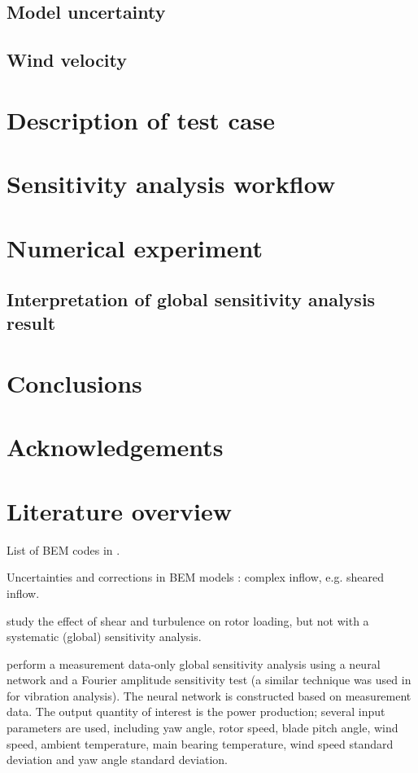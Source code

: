 \documentclass[review]{elsarticle}
\numberwithin{equation}{section}
\newcommand{\myreferences}{./Bibliography/references,./Bibliography/Mendeley_refs}
\numberwithin{equation}{section}
\begin{document}
\subsection{Model uncertainty}
\subsection{Wind velocity}

\section{Description of test case}

\section{Sensitivity analysis workflow}

\section{Numerical experiment}
\subsection{Interpretation of global sensitivity analysis result}

\section{Conclusions}

\section*{Acknowledgements}


\appendix
\section{Literature overview}
List of BEM codes in \cite{Sayed2019,Vorpahl2013}.

Uncertainties and corrections in BEM models \cite{Madsen2012}: complex inflow, e.g. sheared inflow.

\cite{Eggers2003} study the effect of shear and turbulence on rotor loading, but not with a systematic (global) sensitivity analysis.

\cite{McKay2014} perform a measurement data-only global sensitivity analysis using a neural network and a Fourier amplitude sensitivity test (a similar technique was used in \cite{Kusiak2010} for vibration analysis). The neural network is constructed based on measurement data. The output quantity of interest is the power production; several input parameters are used, including yaw angle, rotor speed, blade pitch angle, wind speed, ambient temperature, main bearing temperature, wind speed standard deviation and yaw angle standard deviation.
\end{document}
